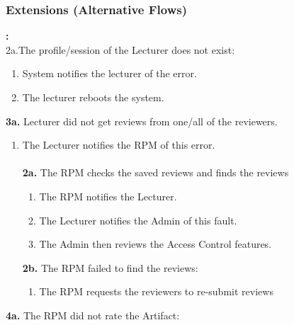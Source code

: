      \subsubsection*{Extensions (Alternative Flows)}\textbf{:}
     \newline
     \\
     2a.The profile/session of the Lecturer does not exist: 
     \begin{enumerate}
         \itemsep-1em 
        \item System notifies the lecturer of the error.
         \item The lecturer reboots the system.
    \end{enumerate}
    \newpage
    \textbf{3a.} Lecturer did not get reviews from one/all of the reviewers.
\begin{enumerate}
        \itemsep-1em 
        \item The Lecturer notifies the RPM of this error.\\
        \\
       \textbf{ 2a.} The RPM checks the saved reviews and finds the reviews
        \begin{enumerate}
            \itemsep-1em 
            \item The RPM notifies the Lecturer.
            \item The Lecturer notifies the Admin of this fault.
            \item The Admin then reviews the Access Control features.
        \end{enumerate}
       \textbf{ 2b.} The RPM failed to find the reviews:
        \begin{enumerate}
              \itemsep-1em 
            \item The RPM requests the reviewers to re-submit reviews
        \end{enumerate}
    \end{enumerate}
    
    \textbf{4a.} The RPM did not rate the Artifact:
    
